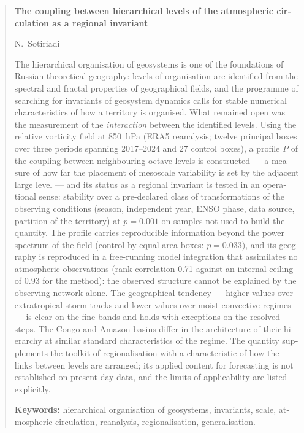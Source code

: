\documentclass[11pt,a4paper]{article}
\begin{document}
\begin{english}
\begin{abstract}
\noindent\textbf{The coupling between hierarchical levels of the atmospheric circulation as a
regional invariant}

\smallskip\noindent N.~Sotiriadi

\smallskip\noindent The hierarchical organisation of geosystems is one of the foundations of Russian
theoretical geography: levels of organisation are identified from the spectral and fractal properties
of geographical fields, and the programme of searching for invariants of geosystem dynamics calls for
stable numerical characteristics of how a territory is organised. What remained open was the
measurement of the \emph{interaction} between the identified levels. Using the relative vorticity
field at 850~hPa (ERA5 reanalysis; twelve principal boxes over three periods spanning 2017--2024 and
27 control boxes), a profile $P$ of the coupling between neighbouring octave levels is constructed ---
a measure of how far the placement of mesoscale variability is set by the adjacent large level --- and
its status as a regional invariant is tested in an operational sense: stability over a pre-declared
class of transformations of the observing conditions (season, independent year, ENSO phase, data
source, partition of the territory) at $p=0.001$ on samples not used to build the quantity. The
profile carries reproducible information beyond the power spectrum of the field (control by
equal-area boxes: $p=0.033$), and its geography is reproduced in a free-running model integration
that assimilates no atmospheric observations (rank correlation 0.71 against an internal ceiling of
0.93 for the method): the observed structure cannot be explained by the observing network alone. The
geographical tendency --- higher values over extratropical storm tracks and lower values over
moist-convective regimes --- is clear on the fine bands and holds with exceptions on the resolved
steps. The Congo and Amazon basins differ in the architecture of their hierarchy at similar standard
characteristics of the regime. The quantity supplements the toolkit of regionalisation with a
characteristic of how the links between levels are arranged; its applied content for forecasting is
not established on present-day data, and the limits of applicability are listed explicitly.

\smallskip
\noindent\textbf{Keywords:} hierarchical organisation of geosystems, invariants, scale, atmospheric
circulation, reanalysis, regionalisation, generalisation.
\end{abstract}
\end{english}
\end{document}
